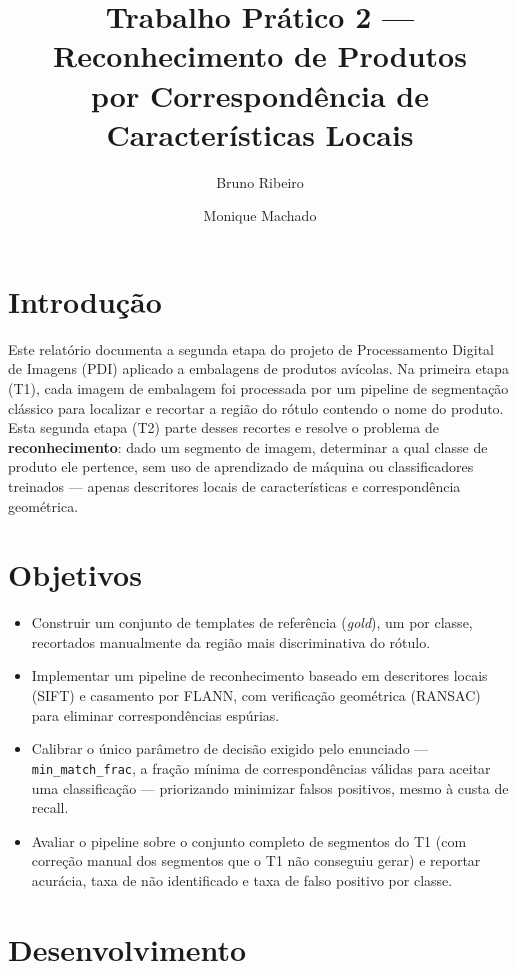 \documentclass[a4paper,11pt]{article}
\title{Trabalho Prático 2 --- Reconhecimento de Produtos\\por Correspondência de Características Locais}
\author{Bruno Ribeiro \and Monique Machado}
\date{}
\begin{document}
\maketitle

\section{Introdução}

Este relatório documenta a segunda etapa do projeto de Processamento Digital de Imagens (PDI)
aplicado a embalagens de produtos avícolas. Na primeira etapa (T1), cada imagem de embalagem foi
processada por um pipeline de segmentação clássico para localizar e recortar a região do rótulo
contendo o nome do produto. Esta segunda etapa (T2) parte desses recortes e resolve o problema de
\textbf{reconhecimento}: dado um segmento de imagem, determinar a qual classe de produto ele
pertence, sem uso de aprendizado de máquina ou classificadores treinados --- apenas descritores
locais de características e correspondência geométrica.

\section{Objetivos}

\begin{itemize}[nosep]
  \item Construir um conjunto de templates de referência (\emph{gold}), um por classe, recortados
        manualmente da região mais discriminativa do rótulo.
  \item Implementar um pipeline de reconhecimento baseado em descritores locais (SIFT) e
        casamento por FLANN, com verificação geométrica (RANSAC) para eliminar correspondências
        espúrias.
  \item Calibrar o único parâmetro de decisão exigido pelo enunciado ---
        \texttt{min\_match\_frac}, a fração mínima de correspondências válidas para aceitar uma
        classificação --- priorizando minimizar falsos positivos, mesmo à custa de recall.
  \item Avaliar o pipeline sobre o conjunto completo de segmentos do T1 (com correção manual dos
        segmentos que o T1 não conseguiu gerar) e reportar acurácia, taxa de não identificado e
        taxa de falso positivo por classe.
\end{itemize}

\section{Desenvolvimento}
\end{document}
